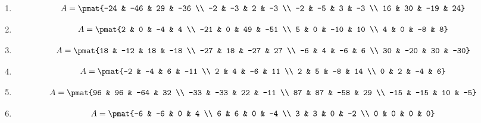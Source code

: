 \begin{enumerate}
\item

\begin{align*}
A = \pmat{-24 & -46 & 29 & -36 \\ -2 & -3 & 2 & -3 \\ -2 & -5 & 3 & -3 \\ 16 & 30 & -19 & 24}
\end{align*}

\item

\begin{align*}
A = \pmat{2 & 0 & -4 & 4 \\ -21 & 0 & 49 & -51 \\ 5 & 0 & -10 & 10 \\ 4 & 0 & -8 & 8}
\end{align*}

\item

\begin{align*}
A = \pmat{18 & -12 & 18 & -18 \\ -27 & 18 & -27 & 27 \\ -6 & 4 & -6 & 6 \\ 30 & -20 & 30 & -30}
\end{align*}

\item

\begin{align*}
A = \pmat{-2 & -4 & 6 & -11 \\ 2 & 4 & -6 & 11 \\ 2 & 5 & -8 & 14 \\ 0 & 2 & -4 & 6}
\end{align*}

\item

\begin{align*}
A = \pmat{96 & 96 & -64 & 32 \\ -33 & -33 & 22 & -11 \\ 87 & 87 & -58 & 29 \\ -15 & -15 & 10 & -5}
\end{align*}

\item

\begin{align*}
A = \pmat{-6 & -6 & 0 & 4 \\ 6 & 6 & 0 & -4 \\ 3 & 3 & 0 & -2 \\ 0 & 0 & 0 & 0}
\end{align*}


\end{enumerate}
